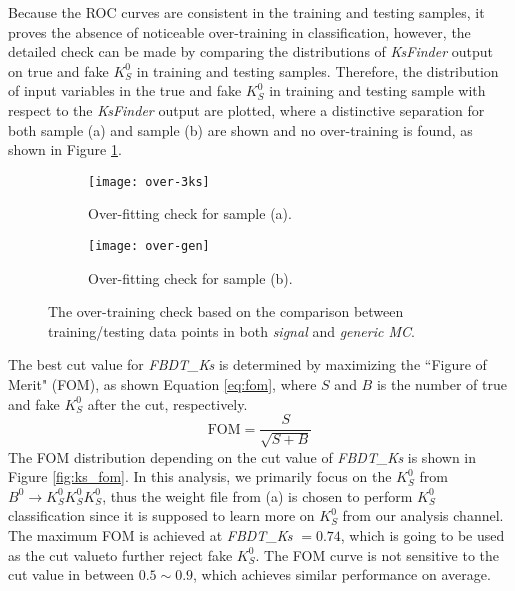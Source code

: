 Because the ROC curves are consistent in the training and testing samples, it proves the absence of noticeable over-training in classification, however, the detailed check can be made by comparing the distributions of \textit{KsFinder} output on true and fake $K_S^0$ in training and testing samples. Therefore, the distribution of input variables in the true and fake $K_S^0$ in training and testing sample with respect to the \textit{KsFinder} output are plotted, where a distinctive separation for both sample (a) and sample (b) are shown and no over-training is found, as shown in Figure \ref{fig:ks_overtraining}.
\begin{figure}[htpb]
	\begin{subfigure}{1\linewidth}
		\centering
		\texttt{[image: over-3ks]}
		\caption{Over-fitting check for sample (a).}
	\end{subfigure}
  	\vspace{0.3cm}

	\begin{subfigure}{1\linewidth}
		\centering
		\texttt{[image: over-gen]}
		\caption{Over-fitting check for sample (b).}
	\end{subfigure}
\caption{The over-training check based on the comparison between training/testing data points in both \textit{signal} and \textit{generic MC}.}
\label{fig:ks_overtraining}
	\vspace{0.3cm}
	
\end{figure}


The best cut value for \textit{FBDT\_Ks} is determined by maximizing the ``Figure of Merit" (FOM), as shown Equation \ref{eq:fom}, where $S$ and $B$ is the number of true and fake $K_S^0$ after the cut, respectively.
\begin{equation}\label{eq:fom}
\text{FOM} = \frac{S}{\sqrt{S+B}}
\end{equation}
 The FOM distribution depending on the cut value of \textit{FBDT\_Ks} is shown in Figure \ref{fig:ks_fom}. In this analysis, we primarily focus on the $K_S^0$ from $B^0 \to K_S^0  K_S^0  K_S^0$, thus the weight file from (a) is chosen to perform $K_S^0$ classification since it is supposed to learn more on $K_S^0$ from our analysis channel. The maximum FOM is achieved at \textit{FBDT\_Ks} $= 0.74$, which is going to be used as the cut value\footnotemark to further reject fake $K_S^0$. The FOM curve is not sensitive to the cut value in between $0.5 \sim 0.9$, which achieves similar performance on average.


